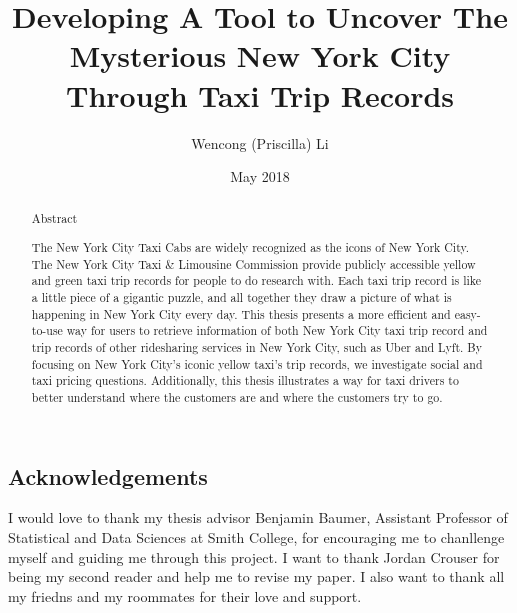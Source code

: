 \documentclass[12pt,twoside]{reedthesis}
\title{Developing A Tool to Uncover The Mysterious New York City Through Taxi
Trip Records}
\author{Wencong (Priscilla) Li}
\date{May 2018}
\theoremstyle{definition}
\theoremstyle{definition}
\theoremstyle{definition}
\theoremstyle{remark}
\begin{document}
  \maketitle

\frontmatter %
\pagestyle{empty} %
  \begin{acknowledgements}
    \chapter*{Acknowledgements}\label{acknowledgements}
    
    I would love to thank my thesis advisor Benjamin Baumer, Assistant
    Professor of Statistical and Data Sciences at Smith College, for
    encouraging me to chanllenge myself and guiding me through this project.
    I want to thank Jordan Crouser for being my second reader and help me to
    revise my paper. I also want to thank all my friedns and my roommates
    for their love and support.
  \end{acknowledgements}

  \hypersetup{linkcolor=black}
  \setcounter{tocdepth}{2}
  \tableofcontents

  \listoftables

  \listoffigures
  \begin{abstract}
    \chapter*{Abstract}\label{abstract}
    
    The New York City Taxi Cabs are widely recognized as the icons of New
    York City. The New York City Taxi \& Limousine Commission provide
    publicly accessible yellow and green taxi trip records for people to do
    research with. Each taxi trip record is like a little piece of a
    gigantic puzzle, and all together they draw a picture of what is
    happening in New York City every day. This thesis presents a more
    efficient and easy-to-use way for users to retrieve information of both
    New York City taxi trip record and trip records of other ridesharing
    services in New York City, such as Uber and Lyft. By focusing on New
    York City's iconic yellow taxi's trip records, we investigate social and
    taxi pricing questions. Additionally, this thesis illustrates a way for
    taxi drivers to better understand where the customers are and where the
    customers try to go.
  \end{abstract}
\end{document}
